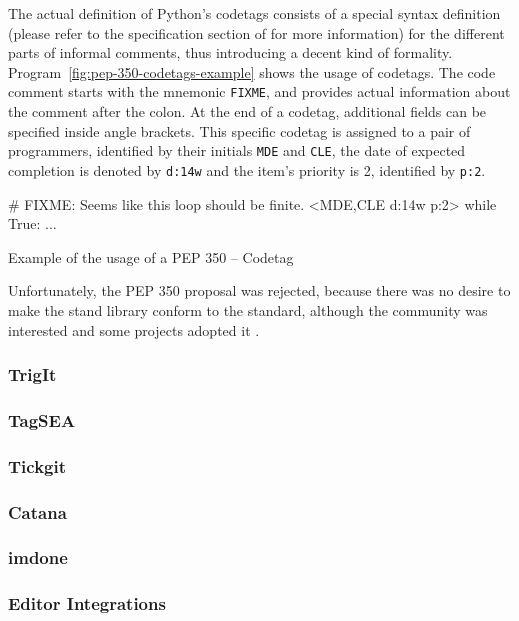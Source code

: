 The actual definition of Python's codetags consists of a special syntax definition (please refer to the specification section of \cite{elliott_pep_2005} for more information) for the different parts of informal comments, thus introducing a decent kind of formality.
Program~\ref{fig:pep-350-codetags-example} shows the usage of codetags.
The code comment starts with the mnemonic \texttt{FIXME}, and provides actual information about the comment after the colon.
At the end of a codetag, additional fields can be specified inside angle brackets.
This specific codetag is assigned to a pair of programmers, identified by their initials \texttt{MDE} and \texttt{CLE}, the date of expected completion is denoted by \texttt{d:14w} and the item's priority is 2, identified by \texttt{p:2}. 
%
\begin{program}[h]
\begin{PythonCode}
# FIXME: Seems like this loop should be finite. <MDE,CLE d:14w p:2>
while True: ...
\end{PythonCode}
\caption{Example of the usage of a PEP 350 -- Codetag}
\label{fig:pep-350-codetags-example}
\end{program}
%
Unfortunately, the PEP 350 proposal was rejected, because there was no desire to make the stand library conform to the standard, although the community was interested and some projects adopted it \cite{elliott_pep_2005}.


\subsubsection{TrigIt}
\subsubsection{TagSEA \cite{storey_how_2009}}
\subsubsection{Tickgit}
\subsubsection{Catana}
\subsubsection{imdone}
\subsubsection{Editor Integrations}
